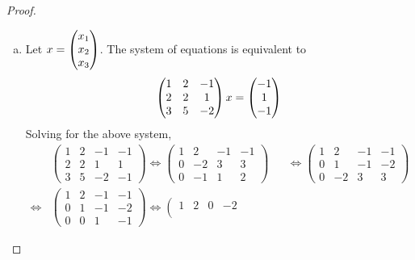 \begin{proof}
    \renewcommand{\qedsymbol}{$\blacksquare$}
    \begin{enumerate}[(a)]
        \item Let $x=\begin{pmatrix} x_1\\ x_2\\ x_3\end{pmatrix}$.
        The system of equations is equivalent to 
        \[
            \begin{aligned}
                \begin{pmatrix}
                    1 & 2 & -1 \\
                    2 & 2 & 1 \\
                    3 & 5 & -2
                \end{pmatrix}x=\begin{pmatrix} -1\\ 1\\ -1\end{pmatrix}
            \end{aligned}
        \]
        Solving for the above system,
        \[
        \begin{aligned}
        &\left(
            \begin{array}{ccc|c}
                1 & 2 & -1 & -1\\
                2 & 2 & 1 & 1\\
                3 & 5 & -2 & -1
            \end{array}
        \right)
        \Leftrightarrow
        \left(
            \begin{array}{ccc|c}
                1 & 2 & -1 & -1\\
                0 & -2 & 3 & 3\\
                0 & -1 & 1 & 2
            \end{array}
        \right)
        &&\Leftrightarrow
        \left(
            \begin{array}{ccc|c}
                1 & 2 & -1 & -1\\
                0 & 1 & -1 & -2\\
                0 & -2 & 3 & 3
            \end{array}
        \right)
        \\
        \Leftrightarrow
        &\left(
            \begin{array}{ccc|c}
                1 & 2 & -1 & -1\\
                0 & 1 & -1 & -2\\
                0 & 0 & 1 & -1
            \end{array}
        \right)
        \Leftrightarrow
        \left(
            \begin{array}{ccc|c}
                1 & 2 & 0 & -2\\

\end{array}
\end{aligned}\]
\end{enumerate}
\end{proof}
